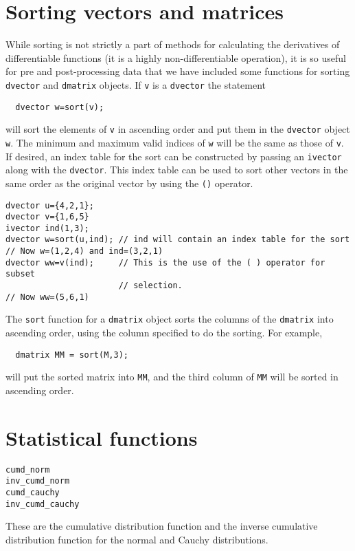 \section{Sorting vectors and matrices}

While sorting is not strictly a part of methods for calculating the
derivatives of differentiable functions (it is a highly non-differentiable
operation), it is so useful for pre and post-processing data that we
have included some functions for sorting \texttt{dvector} and \texttt{dmatrix}
objects. If \texttt{v} is a \texttt{dvector} the statement
\begin{lstlisting}
  dvector w=sort(v);
\end{lstlisting}
will sort the elements of \texttt{v} in ascending order and 
put them in the \texttt{dvector} object \texttt{w}. The minimum and
maximum valid indices of \texttt{w} will be the same as those of \texttt{v}.
If desired, an index table for the sort can be constructed by passing
an \texttt{ivector} along with the \texttt{dvector}. This index table can be
used to sort other vectors in the same order as the original vector
by using the \texttt{()} operator.
\begin{lstlisting}
dvector u={4,2,1};
dvector v={1,6,5}
ivector ind(1,3);
dvector w=sort(u,ind); // ind will contain an index table for the sort
// Now w=(1,2,4) and ind=(3,2,1)
dvector ww=v(ind);     // This is the use of the ( ) operator for subset
                       // selection. 
// Now ww=(5,6,1)
\end{lstlisting}

The \texttt{sort} function for a \texttt{dmatrix} object sorts the columns of the
\texttt{dmatrix} into ascending order, using the column specified to do the
sorting. For example,
\begin{lstlisting}
  dmatrix MM = sort(M,3);
\end{lstlisting}
will put the sorted matrix into \texttt{MM}, and the third column of
\texttt{MM} will be sorted in ascending order.


\section{Statistical functions}

\begin{lstlisting}
cumd_norm
inv_cumd_norm
cumd_cauchy
inv_cumd_cauchy
\end{lstlisting}
These are the cumulative distribution function and the inverse cumulative distribution 
function for the normal and Cauchy distributions.


